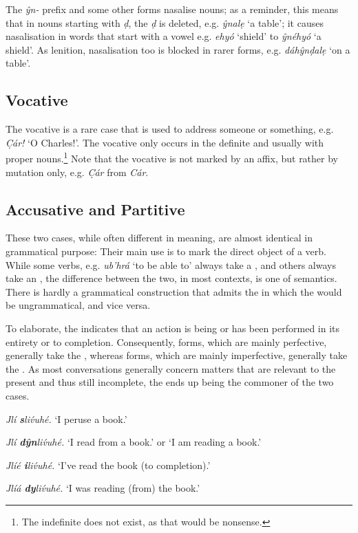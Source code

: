 \documentclass[a4paper, 12pt, twoside, openright, final]{book}
\def \b {ḅ}
\let \w \textit
\let \b \textbf
\begin{document}
The  \w{ŷn-} prefix and some other forms nasalise nouns; as a reminder, this means that in
nouns starting with \w{ḍ}, the \w{ḍ} is deleted, e.g. \w{ŷnalẹ} ‘a table’; it causes nasalisation in words
that start with a vowel e.g. \w{ehyó} ‘shield’ to \w{ŷnéhyó} ‘a shield’. As lenition, nasalisation too is
blocked in rarer forms, e.g.  \w{dáhŷnḍalẹ} ‘on a table’.

\subsection{Vocative}
The vocative is a rare case that is used to address someone or something, e.g. \w{C̣ár!} ‘O Charles!’. The vocative
only occurs in the definite and usually with proper nouns.\footnote{The indefinite 
does not exist, as that would be nonsense.} Note that the vocative is not marked by an affix, but
rather by mutation only, e.g. \w{C̣ár} from \w{Cár}.

\subsection{Accusative and Partitive}
These two cases, while often different in meaning, are almost identical in grammatical purpose: Their main use is to
mark the direct object of a verb. While some verbs, e.g. \w{ub’hrá} ‘to be able to’ always take a , and others
always take an , the difference between the two, in most contexts, is one of semantics. There is hardly a grammatical
construction that admits the  in which the  would be ungrammatical, and vice versa.

To elaborate, the  indicates that an action is being or has been performed in its entirety or to completion. Consequently,
 forms, which are mainly perfective, generally take the , whereas  forms, which are mainly imperfective,
generally take the . As most conversations generally concern matters that are relevant to the present and thus still incomplete,
the  ends up being the commoner of the two cases.
\begin{examples}
    \item \w{Jlí \b{s}liv́uhé.} ‘I peruse a book.’
    \item \w{Jlí \b{dŷn}liv́uhé.} ‘I read from a book.’ or ‘I am reading a book.’
    \item \w{Jlíé \b{i}liv́uhé.} ‘I’ve read the book (to completion).’
    \item \w{Jlíá \b{dy}liv́uhé.} ‘I was reading (from) the book.’
\end{examples}
\end{document}
